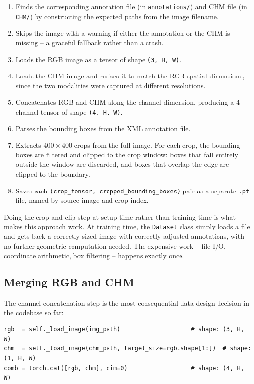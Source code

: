 \documentclass[11pt, a4paper]{article}
\newenvironment{intuition}{%
  \begin{tcolorbox}[
    colback=warnbg, colframe=warnframe,
    fonttitle=\bfseries, title=Why does the code do this?,
    breakable, enhanced
  ]
}{%
  \end{tcolorbox}
}
\begin{document}
\begin{enumerate}
  \item Finds the corresponding annotation file (in \texttt{annotations/}) and
        CHM file (in \texttt{CHM/}) by constructing the expected paths from the
        image filename.
  \item Skips the image with a warning if either the annotation or the CHM is
        missing -- a graceful fallback rather than a crash.
  \item Loads the RGB image as a tensor of shape \texttt{(3, H, W)}.
  \item Loads the CHM image and resizes it to match the RGB spatial dimensions,
        since the two modalities were captured at different resolutions.
  \item Concatenates RGB and CHM along the channel dimension, producing a
        4-channel tensor of shape \texttt{(4, H, W)}.
  \item Parses the bounding boxes from the XML annotation file.
  \item Extracts $400 \times 400$ crops from the full image. For each crop, the
        bounding boxes are filtered and clipped to the crop window: boxes that
        fall entirely outside the window are discarded, and boxes that overlap
        the edge are clipped to the boundary.
  \item Saves each \texttt{(crop\_tensor, cropped\_bounding\_boxes)} pair as a
        separate \texttt{.pt} file, named by source image and crop index.
\end{enumerate}

\begin{intuition}
  Doing the crop-and-clip step at setup time rather than training time is what
  makes this approach work. At training time, the \texttt{Dataset} class simply
  loads a file and gets back a correctly sized image with correctly adjusted
  annotations, with no further geometric computation needed. The expensive work
  -- file I/O, coordinate arithmetic, box filtering -- happens exactly once.
\end{intuition}

\subsection{Merging RGB and CHM}

The channel concatenation step is the most consequential data design decision
in the codebase so far:

\begin{lstlisting}
rgb  = self._load_image(img_path)                    # shape: (3, H, W)
chm  = self._load_image(chm_path, target_size=rgb.shape[1:])  # shape: (1, H, W)
comb = torch.cat([rgb, chm], dim=0)                  # shape: (4, H, W)
\end{lstlisting}
\end{document}
